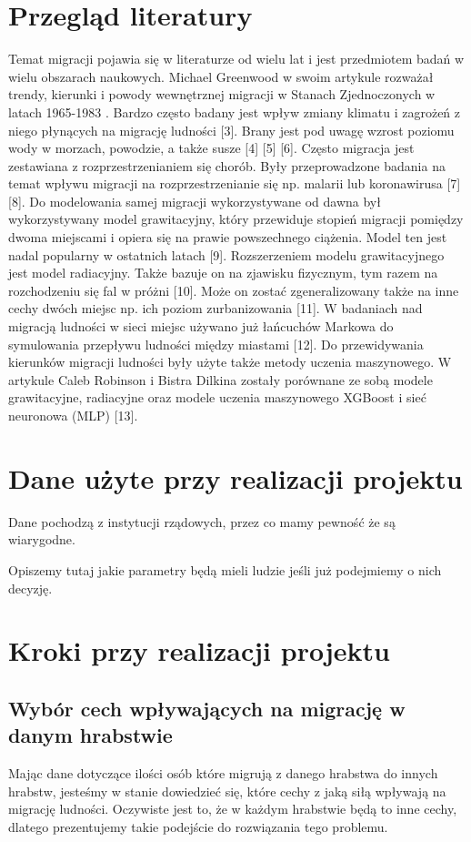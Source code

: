 \documentclass[a4paper,12pt]{article}
\begin{document}
\section*{Przegląd literatury}
Temat migracji pojawia się w literaturze od wielu lat i jest przedmiotem badań w wielu obszarach naukowych.  Michael Greenwood w swoim artykule rozważał trendy, kierunki i powody wewnętrznej migracji w Stanach Zjednoczonych w latach 1965-1983 \cite*{Greenwood1985HumanMT}. Bardzo często badany jest wpływ zmiany klimatu i zagrożeń z niego płynących na migrację ludności [3]. Brany jest pod uwagę wzrost poziomu wody w morzach, powodzie, a także susze [4] [5] [6]. Często migracja jest zestawiana z rozprzestrzenianiem się chorób. Były przeprowadzone badania na temat wpływu migracji na rozprzestrzenianie się np. malarii lub koronawirusa [7] [8].
Do modelowania samej migracji wykorzystywane od dawna był wykorzystywany model grawitacyjny, który przewiduje stopień migracji pomiędzy dwoma miejscami i opiera się na prawie powszechnego ciążenia. Model ten jest nadal popularny w ostatnich latach [9].  Rozszerzeniem modelu grawitacyjnego jest model radiacyjny. Także bazuje on na zjawisku fizycznym, tym razem na rozchodzeniu się fal w próżni [10]. Może on zostać zgeneralizowany także na inne cechy dwóch miejsc  np. ich poziom zurbanizowania [11].  W badaniach nad migracją ludności w sieci miejsc używano już łańcuchów Markowa do symulowania przepływu ludności między miastami [12].  Do przewidywania kierunków migracji ludności były użyte także metody uczenia maszynowego. W artykule Caleb Robinson i Bistra Dilkina zostały porównane ze sobą modele grawitacyjne, radiacyjne oraz modele uczenia maszynowego XGBoost i sieć neuronowa (MLP) [13].



\section*{Dane użyte przy realizacji projektu}
Dane pochodzą z instytucji rządowych, przez co mamy pewność że są wiarygodne.

Opiszemy tutaj jakie parametry będą mieli ludzie jeśli już podejmiemy o nich decyzję.

\newpage
\section*{Kroki przy realizacji projektu}
\subsection*{Wybór cech wpływających na migrację w danym hrabstwie}
Mając dane dotyczące ilości osób które migrują z danego hrabstwa do innych hrabstw, jesteśmy w stanie dowiedzieć się, które cechy z jaką siłą wpływają na migrację ludności. Oczywiste jest to, że w każdym hrabstwie będą to inne cechy, dlatego prezentujemy takie podejście do rozwiązania tego problemu.
\end{document}
